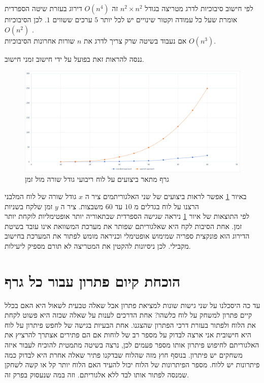\documentclass[12pt,twoside]{article}
\begin{document}
לפי חישוב סיבוכיות
לדרג מטריצה 
בגודל 
$n^2 \times n^2$
זה 
$O(n^4)$
דירוג בעזרת שיטה הספרדית אומרת
שעל כל עמודה 
וקטור שינויים 
יש לכל יותר
$5$
ערכים ששווים 
$1$.
לכן הסיבוכיות 
$O(n^2)$
.
\\
אם נעבוד בשיטה 
שרק צריך לדרג את
$n$
שורות 
אחרונות
הסיבוכיות 
$O(n^3)$.

ננסה להראות זאת בפועל על ידי חישוב זמני חישוב.

\begin{figure}[ht]
    \caption{ 
    גרף מתאר ביצועים על לוח ריבועי גודל שורה מול זמן
    }
    \label{fig: prefofmance diagram}
    \unsethebrew
    \centering
    \includegraphics[width=\textwidth,height=\textheight,keepaspectratio]{images/benchmark.png}
\end{figure}
\sethebrew

באיור 
\ref{fig: prefofmance diagram}
אפשר לראות ביצועים
של שני האלגוריתמים ציר 
ה
$x$
גודל שורה של לוח המלבני
הרצנו על 
לוח בגדלים 
מ
$10$
עד 
$60$
משבצות.
ציר ה
$y$
זמן שלקח 
בשניות
\\
לפי התוצאות של איור 
\ref{fig: prefofmance diagram}
ניראה 
שגישה הספרדית שבתאוריה יותר אופטימליות לוקחת יותר זמן.
אחת הסיבות לקח היא שאלגוריתם שפותר את מערכת המשוואת אינו עובד בשיטת הדירוג
הוא פונקצית ספריה שמימוש אופטימלי וכניראה מומש לפתור את המערכת בחישוב מקבילי.
לכן ניסיונות להקטין  את המטריצה לא תורם מספיק ליעילות.

\newpage
\section{הוכחת  קיום פתרון עבור כל גרף}
עד כה היסכלנו על שני גישות שונות למציאת פתרון
אבל שאלה טבעית לשאול היא האם בכלל קיים פתרון למשחק על לוח כלשהו?
אחת הדרכים לענות על שאלה שכזה היא פשוט לקחת את הלוח ולפתור בעזרת 
דרכי הפתרון שהצגנו.
אחת הבעיות בגישה של לחפש פיתרון על לוח היא חישובית אני ארצה 
לבדוק על מספר רב של לוחות אם הם פתירים אצתרך להרציץ
את האלגוריתם לחיפוש פיתרון אותו מספר פעמים
לכן, נרצה בשיטה מתמטית להוכיח לעבור איזה משחקים יש פיתרון.
בנוסף חוץ מזה שהלוח שבדקנו פתיר שאלה אחרת היא לבדוק כמה פיתרונות יש ללוח.
מספר הפיתרונות של הלוח יכול להעיד האם הלוח יותר קל או קשה לשחקן שמנסה לפתור אותו
לבד ללא אלגוריתם.
וזה במה שנעסוק בפרק זה.
\end{document}
